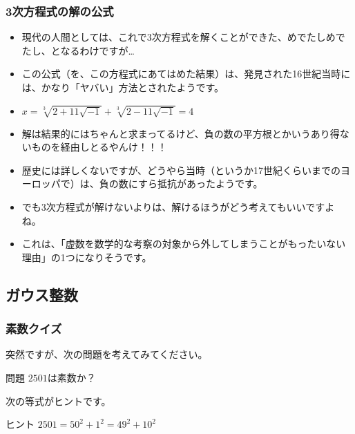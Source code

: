 \documentclass[dvipdfmx]{beamer}
\begin{document}
  \begin{frame}
    \frametitle{3次方程式の解の公式}
  
    \begin{itemize}
      \item 現代の人間としては、これで3次方程式を解くことができた、めでたしめでたし、となるわけですが…
      \item この公式（を、この方程式にあてはめた結果）は、発見された16世紀当時には、かなり「ヤバい」方法とされたようです。
      \item $x = \sqrt[3]{2 + 11\sqrt{-1}} + \sqrt[3]{2 - 11\sqrt{-1}} = 4$
      \pause
      \item 解は結果的にはちゃんと求まってるけど、\alert{負の数の平方根とかいうあり得ないもの}を経由しとるやんけ！！！
      \pause
      \item 歴史には詳しくないですが、どうやら当時（というか17世紀くらいまでのヨーロッパで）は、負の数にすら抵抗があったようです。
      \item でも3次方程式が解けないよりは、解けるほうがどう考えてもいいですよね。
      \item これは、「虚数を数学的な考察の対象から外してしまうことがもったいない理由」の1つになりそうです。
    \end{itemize}
  
  \end{frame}

  \subsection{ガウス整数}

  \begin{frame}
    \frametitle{素数クイズ}
  
    突然ですが、次の問題を考えてみてください。
    \begin{block}{問題}
      $2501$は素数か？
    \end{block}
    \pause
    次の等式がヒントです。
    \begin{block}{ヒント}
      $2501 = 50^2 + 1^2 = 49^2 + 10^2$
    \end{block}
  
  \end{frame}
\end{document}
